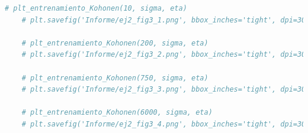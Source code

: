 \documentclass[aps,prb,twocolumn,superscriptaddress,floatfix,longbibliography]{revtex4-2}
\begin{document}
\begin{lstlisting}[language=Python]
    # plt_entrenamiento_Kohonen(10, sigma, eta)
    # plt.savefig('Informe/ej2_fig3_1.png', bbox_inches='tight', dpi=300)
    
    # plt_entrenamiento_Kohonen(200, sigma, eta)
    # plt.savefig('Informe/ej2_fig3_2.png', bbox_inches='tight', dpi=300)
    
    # plt_entrenamiento_Kohonen(750, sigma, eta)
    # plt.savefig('Informe/ej2_fig3_3.png', bbox_inches='tight', dpi=300)
    
    # plt_entrenamiento_Kohonen(6000, sigma, eta)
    # plt.savefig('Informe/ej2_fig3_4.png', bbox_inches='tight', dpi=300)
        

\end{lstlisting}


\end{document}
